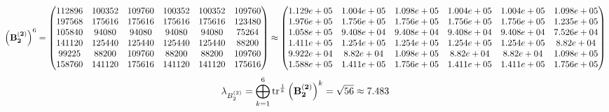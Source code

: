 \documentclass[10pt,a4paper]{article}
\begin{document}
	\[
		\left(\bold{B_2^{(2)}}\right)^{6} = 
		\begin{pmatrix}
			{{112896}}{} & {{100352}}{} & {{109760}}{} & {{100352}}{} & {{100352}}{} & {{109760}}{} \\
			{{197568}}{} & {{175616}}{} & {{175616}}{} & {{175616}}{} & {{175616}}{} & {{123480}}{} \\
			{{105840}}{} & {{94080}}{} & {{94080}}{} & {{94080}}{} & {{94080}}{} & {{75264}}{} \\
			{{141120}}{} & {{125440}}{} & {{125440}}{} & {{125440}}{} & {{125440}}{} & {{88200}}{} \\
			{{99225}}{} & {{88200}}{} & {{109760}}{} & {{88200}}{} & {{88200}}{} & {{109760}}{} \\
			{{158760}}{} & {{141120}}{} & {{175616}}{} & {{141120}}{} & {{141120}}{} & {{175616}}{} \\
		\end{pmatrix}
		\approx
		\begin{pmatrix}
			1.129e+05 & 1.004e+05 & 1.098e+05 & 1.004e+05 & 1.004e+05 & 1.098e+05 \\
			1.976e+05 & 1.756e+05 & 1.756e+05 & 1.756e+05 & 1.756e+05 & 1.235e+05 \\
			1.058e+05 & 9.408e+04 & 9.408e+04 & 9.408e+04 & 9.408e+04 & 7.526e+04 \\
			1.411e+05 & 1.254e+05 & 1.254e+05 & 1.254e+05 & 1.254e+05 & 8.82e+04 \\
			9.922e+04 & 8.82e+04 & 1.098e+05 & 8.82e+04 & 8.82e+04 & 1.098e+05 \\
			1.588e+05 & 1.411e+05 & 1.756e+05 & 1.411e+05 & 1.411e+05 & 1.756e+05 \\
		\end{pmatrix}
	\]
	\[
		\lambda_{B_2^{(2)}} =  \bigoplus ^{6} _{k = 1} \operatorname{tr} ^{\frac 1 k} \left( \bold{B_2^{(2)}} \right)^k = {\sqrt{56}}{}\approx 7.483
	\]
\end{document}
